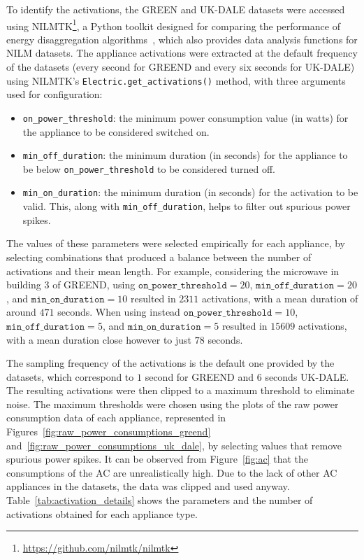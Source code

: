 To identify the activations, the GREEN and UK-DALE datasets were accessed using NILMTK\footnote{\url{https://github.com/nilmtk/nilmtk}}, a Python toolkit designed for comparing the performance of energy disaggregation algorithms~\parencite{batra_nilmtk_2014}, which also provides data analysis functions for NILM datasets. The appliance activations were extracted at the default frequency of the datasets (every second for GREEND and every six seconds for UK-DALE) using NILMTK's \texttt{Electric.get\_activations()} method, with three arguments used for configuration:
\begin{itemize}
    \item \texttt{on\_power\_threshold}: the minimum power consumption value (in watts) for the appliance to be considered switched on.
    \item \texttt{min\_off\_duration}: the minimum duration (in seconds) for the appliance to be below \texttt{on\_power\_threshold} to be considered turned off.
    \item \texttt{min\_on\_duration}: the minimum duration (in seconds) for the activation to be valid. This, along with \texttt{min\_off\_duration}, helps to filter out spurious power spikes. 
\end{itemize}
The values of these parameters were selected empirically for each appliance, by selecting combinations that produced a balance between the number of activations and their mean length. For example, considering the microwave in building 3 of GREEND, using $\texttt{on\_power\_threshold} = 20$, $\texttt{min\_off\_duration} = 20$, and $\texttt{min\_on\_duration} = 10$ resulted in $2311$ activations, with a mean duration of around $471$ seconds. When using instead $\texttt{on\_power\_threshold} = 10$, $\texttt{min\_off\_duration} = 5$, and $\texttt{min\_on\_duration} = 5$ resulted in $15609$ activations, with a mean duration close however to just $78$ seconds.

\newpage 

The sampling frequency of the activations is the default one provided by the datasets, which correspond to $1$ second for GREEND and $6$ seconds UK-DALE. The resulting activations were then clipped to a maximum threshold to eliminate noise. The maximum thresholds were chosen using the plots of the raw power consumption data of each appliance, represented in Figures~\ref{fig:raw_power_consumptions_greend} and~\ref{fig:raw_power_consumptions_uk_dale}, by selecting values that remove spurious power spikes. It can be observed from Figure~\ref{fig:ac} that the consumptions of the AC are unrealistically high. Due to the lack of other AC appliances in the datasets, the data was clipped and used anyway. Table~\ref{tab:activation_details} shows the parameters and the number of activations obtained for each appliance type.

